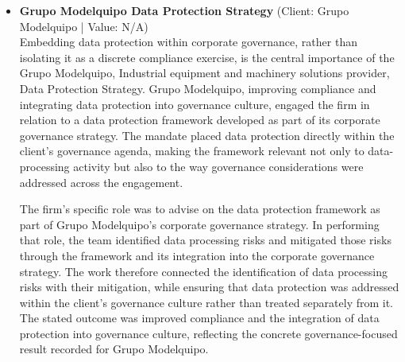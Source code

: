 \documentclass[11pt]{article}
\begin{document}
\begin{itemize}
Arturo González de Araujo, Ernesto Zavala and Damián Ortega led the work. The team designed and implemented policies and training as practical components of the regularisation and restructuring process. Those measures were directed to embedding a data protection culture within Grupo Excelsior’s operations, while aligning the resulting arrangements with governance frameworks. The mandate therefore combined the operational task of restructuring and regularisation with concrete policy and training implementation, creating institutional measures intended to reduce regulatory exposure and place data protection within the client’s governance arrangements.
\item \textbf{Grupo Modelquipo Data Protection Strategy} (Client: Grupo Modelquipo | Value: N/A)\\ Embedding data protection within corporate governance, rather than isolating it as a discrete compliance exercise, is the central importance of the Grupo Modelquipo, Industrial equipment and machinery solutions provider, Data Protection Strategy. Grupo Modelquipo, improving compliance and integrating data protection into governance culture, engaged the firm in relation to a data protection framework developed as part of its corporate governance strategy. The mandate placed data protection directly within the client’s governance agenda, making the framework relevant not only to data-processing activity but also to the way governance considerations were addressed across the engagement.

The firm’s specific role was to advise on the data protection framework as part of Grupo Modelquipo’s corporate governance strategy. In performing that role, the team identified data processing risks and mitigated those risks through the framework and its integration into the corporate governance strategy. The work therefore connected the identification of data processing risks with their mitigation, while ensuring that data protection was addressed within the client’s governance culture rather than treated separately from it. The stated outcome was improved compliance and the integration of data protection into governance culture, reflecting the concrete governance-focused result recorded for Grupo Modelquipo.


\end{itemize}
\end{document}
